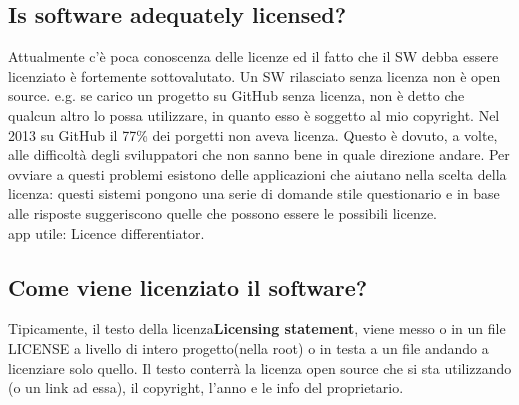 \documentclass[10pt,a4paper]{book}
\begin{document}
\subsection{Is software adequately licensed?}
Attualmente c'è poca conoscenza delle licenze ed il fatto che il SW debba essere licenziato è fortemente sottovalutato.
Un SW rilasciato senza licenza non è open source. e.g. se carico un progetto su GitHub senza licenza, non è detto che qualcun altro lo possa utilizzare, in quanto esso è soggetto al mio copyright.
Nel 2013 su GitHub il 77\% dei porgetti non aveva licenza. Questo è dovuto, a volte, alle difficoltà degli sviluppatori che non sanno bene in quale direzione andare.
Per ovviare a questi problemi esistono delle applicazioni che aiutano nella scelta della licenza: questi sistemi pongono una serie di domande stile questionario e in base alle risposte suggeriscono quelle che possono essere le possibili licenze. \\
app utile: Licence differentiator.

\subsection{Come viene licenziato il software?}
Tipicamente, il testo della licenza\textbf{Licensing statement}, viene messo o in un file LICENSE a livello di intero progetto(nella root) o in testa a un file andando a licenziare solo quello.
Il testo conterrà la licenza open source che si sta utilizzando (o un link ad essa), il copyright, l'anno e le info del proprietario.
\end{document}
